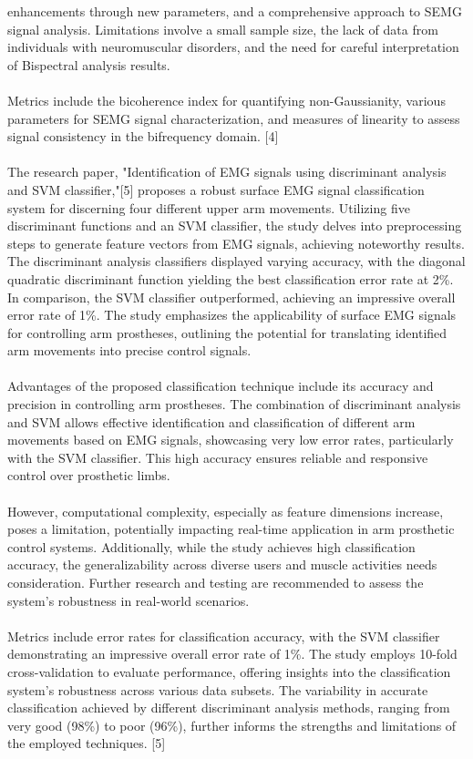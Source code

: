 \documentclass[ 12pt,a4paper,twocolumn,fleqn]{report}
\begin{document}
enhancements through new parameters, and a comprehensive approach to SEMG signal analysis.
Limitations involve a small sample size, the lack of data from individuals with neuromuscular disorders,
and the need for careful interpretation of Bispectral analysis results.
\\
\hfill
\\
Metrics include the bicoherence index for quantifying non-Gaussianity, various parameters for SEMG
signal characterization, and measures of linearity to assess signal consistency in the bifrequency
domain. [4]
\\
\hfill
\\
The research paper, "Identification of EMG signals using discriminant analysis and SVM classifier,"[5]
proposes a robust surface EMG signal classification system for discerning four different upper arm
movements. Utilizing five discriminant functions and an SVM classifier, the study delves into preprocessing steps to generate feature vectors from EMG signals, achieving noteworthy results.
\newpage
  \pagestyle{fancy}
\thisfancypage{%
  \setlength{\fboxsep}{20pt}\doublebox}{}
\normalsize
The discriminant analysis classifiers displayed varying accuracy, with the diagonal quadratic
discriminant function yielding the best classification error rate at 2\%. In comparison, the SVM classifier
outperformed, achieving an impressive overall error rate of 1\%. The study emphasizes the applicability
of surface EMG signals for controlling arm prostheses, outlining the potential for translating identified
arm movements into precise control signals.
\\
\hfill
\\
Advantages of the proposed classification technique include its accuracy and precision in controlling
arm prostheses. The combination of discriminant analysis and SVM allows effective identification and
classification of different arm movements based on EMG signals, showcasing very low error rates,
particularly with the SVM classifier. This high accuracy ensures reliable and responsive control over prosthetic limbs.
\\
\hfill
\\
However, computational complexity, especially as feature dimensions increase, poses a limitation,
potentially impacting real-time application in arm prosthetic control systems. Additionally, while the
study achieves high classification accuracy, the generalizability across diverse users and muscle
activities needs consideration. Further research and testing are recommended to assess the system's
robustness in real-world scenarios.
\\
\hfill
\\
Metrics include error rates for classification accuracy, with the SVM classifier demonstrating an
impressive overall error rate of 1\%. The study employs 10-fold cross-validation to evaluate
performance, offering insights into the classification system's robustness across various data subsets.
The variability in accurate classification achieved by different discriminant analysis methods, ranging
from very good (98\%) to poor (96\%), further informs the strengths and limitations of the employed
techniques. [5]
\newpage
  \pagestyle{fancy}
\thisfancypage{%
  \setlength{\fboxsep}{20pt}\doublebox}{}
\normalsize
\end{document}
